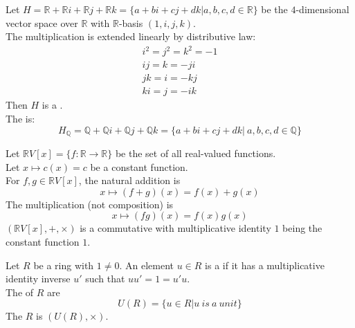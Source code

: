 \begin{remark}
Let $H=\mathbb{R} + \mathbb{R} i + \mathbb{R} j + \mathbb{R} k = \{a+bi+cj+dk|a,b,c,d \in \mathbb{R}\}$ be the $4$-dimensional vector space over $\mathbb{R}$ with $\mathbb{R}$-basis $(1, i, j, k)$.\\
The multiplication is extended linearly by distributive law: 
\begin{align}
i^2 = j^2 = k^2 = -1 \nonumber \\
ij=k=-ji \nonumber \\
jk=i=-kj \nonumber \\
ki=j=-ik \nonumber
\end{align}
Then $H$ is a .\\
The  is:
\begin{equation}
H_\mathbb{Q}=\mathbb{Q}+\mathbb{Q}i+\mathbb{Q}j+\mathbb{Q}k=\{a+bi+cj+dk|\ a, b, c, d\in \mathbb{Q}\} \nonumber
\end{equation}
\end{remark}


\begin{remark}
Let $\mathbb{R}V[x]=\{f:\mathbb{R}\rightarrow\mathbb{R}\}$ be the set of all real-valued functions.\\
Let $x\mapsto c(x) = c$ be a constant function.\\
For $f, g \in \mathbb{R}V[x]$, the natural addition is
\begin{equation}
x\mapsto (f+g)(x) = f(x)+g(x) \nonumber
\end{equation}
The multiplication (not composition) is 
\begin{equation}
x\mapsto (fg)(x)=f(x)g(x) \nonumber
\end{equation}
$(\mathbb{R}V[x], +, \times)$ is a commutative  with multiplicative identity $1$ being the constant function $1$.\\
\end{remark}


\begin{definition}
Let $R$ be a ring with $1 \neq 0$. An element $u \in R$ is a  if it has a multiplicative identity inverse $u'$ such that $uu'=1=u'u$.\\
The  of $R$ are 
\begin{equation}
U(R)=\{u\in R | u \ is \ a \ unit\} \nonumber
\end{equation}
The  $R$ is $(U(R), \times)$.\\
\end{definition}


